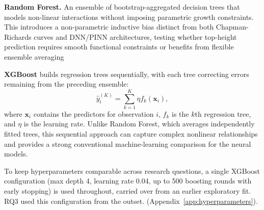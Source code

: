 \documentclass[logo,msc,ai]{infthesis}           %
\begin{document}
\textbf{Random Forest.} An ensemble of bootstrap-aggregated decision trees that models non-linear interactions without imposing parametric growth constraints. This introduces a non-parametric inductive bias distinct from both Chapman-Richards curves and DNN/PINN architectures, testing whether top-height prediction requires smooth functional constraints or benefits from flexible ensemble averaging \cite{lee2018Machine_C3_LID}

\textbf{XGBoost} builds regression trees sequentially, with each tree correcting errors remaining from the preceding ensemble:
\begin{equation}
\hat{y}_i^{(K)} = \sum_{k=1}^{K}\eta f_k(\mathbf{x}_i),
\end{equation}
where $\mathbf{x}_i$ contains the predictors for observation $i$, $f_k$ is the $k$th regression tree, and $\eta$ is the learning rate. Unlike Random Forest, which averages independently fitted trees, this sequential approach can capture complex nonlinear relationships and provides a strong conventional machine-learning comparison for the neural models.

To keep hyperparameters comparable across research questions, a single XGBoost configuration (max depth 4, learning rate 0.04, up to 500 boosting rounds with early stopping) is used throughout, carried over from an earlier exploratory fit. RQ3 used this configuration from the outset.  (Appendix~\ref{app:hyperparameters}).
\end{document}
